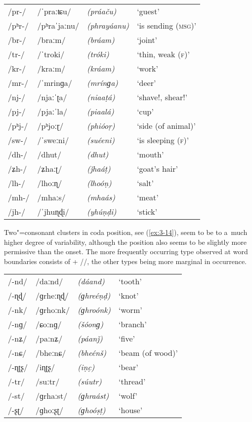\begin{exe}
\extab
\label{ex:3-13}
\begin{tabular}{ l l l l }
/pr-/ &
/ˈpraːʨu/ &
\textit{(práaču)} &
`guest'\\
/pʰr-/ &
/pʰraˈjaːnu/ &
\textit{(phrayáanu)} &
`is sending (\textsc{msg)}'\\
/br-/ &
/braːm/ &
\textit{(bráam)} &
`joint'\\
/tr-/ &
/ˈtroki/ &
\textit{(tróki)} &
`thin, weak (\textsc{f)}'\\
/kr-/ &
/kraːm/ &
\textit{(kráam)} &
`work' \\
/mr-/ &
/ˈmrinɡa/ &
\textit{(mrínɡa)} &
`deer'\\
/nj-/ &
/njaːˈʈa/ &
\textit{(niaaṭá)} &
`shave!, shear!' \\
/pj-/ &
/pjaːˈla/ &
\textit{(piaalá)} &
`cup'\\
/pʰj-/ &
/pʰjoːɽ/ &
\textit{(phióoṛ)} &
`side (of animal)' \\
/sw-/ &
/ˈsweːni/ &
\textit{(suéeni) } &
`is sleeping (\textsc{f)}'\\
/dh-/ &
/dhut/ &
\textit{(dhut)} &
`mouth'\\
/ʑh-/ &
/ʑhaːʈ/ &
\textit{(ǰhaáṭ)} &
`goat's hair'\\
/lh-/ &
/lhoːɳ/ &
\textit{(lhoóṇ) } &
`salt'\\
/mh-/ &
/mhaːs/ &
\textit{(mhaás)} &
`meat'\\
/jh-/ &
/ˈjhuɳɖi/ &
\textit{(yhúṇḍi)} &
`stick'\\
\end{tabular}
\end{exe}


Two"=consonant clusters in coda position, see (\ref{ex:3-14}), seem to be  to a~much higher degree of variability, although the position also seems to be slightly more permissive than the onset. The more frequently occurring type observed at word boundaries consists of  + //, the other types being more marginal in occurrence. 


\begin{exe}
\extab
\label{ex:3-14}
\begin{tabular}{ l l l l }
/-nd/ &
/daːnd/ &
\textit{(dáand)} &
`tooth'\\
/-ɳɖ/ &
/ɡrheːɳɖ/ &
\textit{(ɡhreéṇḍ)} &
`knot'\\
/-nk/ &
/ɡrhoːnk/ &
\textit{(ɡhroónk)} &
`worm'\\
/-nɡ/ &
/ɕoːnɡ/ &
\textit{(šóonɡ) } &
`branch'\\
/-nʑ/ &
/paːnʑ/ &
\textit{(páanǰ) } &
`five' \\
/-nɕ/ &
/bheːnɕ/ &
\textit{(bheénš) } &
`beam (of wood)' \\
/-ɳʈʂ/ &
/iɳʈʂ/ &
\textit{(iṇc̣) } &
`bear' \\
/-tr/ &
/suːtr/ &
\textit{(súutr)} &
`thread' \\
/-st/ &
/ɡrhaːst/ &
\textit{(ɡhraást)} &
`wolf' \\
/-ʂʈ/ &
/ɡhoːʂʈ/ &
\textit{(ɡhoóṣṭ) } &
`house'\\
\end{tabular}
\end{exe}



